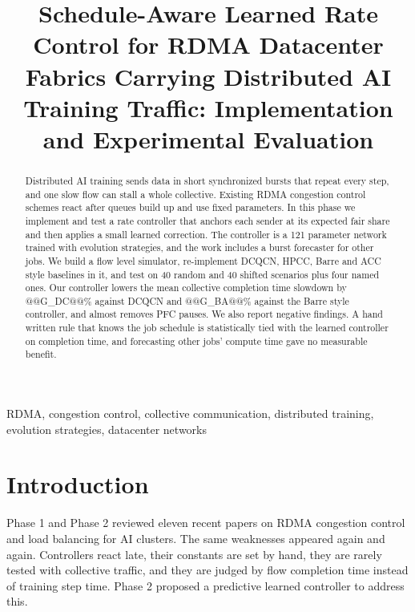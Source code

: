 \documentclass[conference]{IEEEtran}
\begin{document}
\title{Schedule-Aware Learned Rate Control for RDMA Datacenter Fabrics Carrying Distributed AI Training Traffic: Implementation and Experimental Evaluation}

\author{
}

\maketitle

\begin{abstract}
Distributed AI training sends data in short synchronized bursts that repeat every step, and one slow flow can stall a whole collective. Existing RDMA congestion control schemes react after queues build up and use fixed parameters. In this phase we implement and test a rate controller that anchors each sender at its expected fair share and then applies a small learned correction. The controller is a 121 parameter network trained with evolution strategies, and the work includes a burst forecaster for other jobs. We build a flow level simulator, re-implement DCQCN, HPCC, Barre and ACC style baselines in it, and test on 40 random and 40 shifted scenarios plus four named ones. Our controller lowers the mean collective completion time slowdown by @@G_DC@@\% against DCQCN and @@G_BA@@\% against the Barre style controller, and almost removes PFC pauses. We also report negative findings. A hand written rule that knows the job schedule is statistically tied with the learned controller on completion time, and forecasting other jobs' compute time gave no measurable benefit.
\end{abstract}

\begin{IEEEkeywords}
RDMA, congestion control, collective communication, distributed training, evolution strategies, datacenter networks
\end{IEEEkeywords}

\section{Introduction}
Phase 1 and Phase 2 reviewed eleven recent papers on RDMA congestion control and load balancing for AI clusters. The same weaknesses appeared again and again. Controllers react late, their constants are set by hand, they are rarely tested with collective traffic, and they are judged by flow completion time instead of training step time. Phase 2 proposed a predictive learned controller to address this.
\end{document}
